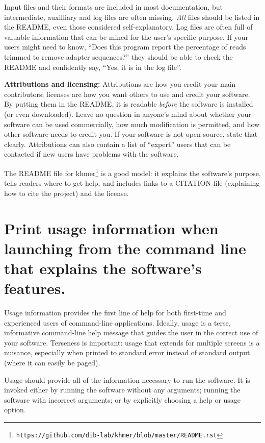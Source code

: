 \documentclass[10pt]{article}
\newcommand{\withurl}[2]{{#1}\footnote{\texttt{#2}}}
\begin{document}
Input files and their formats are included in most documentation, but
intermediate, auxilliary and log files are often missing. 
\emph{All} files should be listed in the README, even those considered self-explanatory. Log
files are often full of valuable information that can be
mined for the user's specific purpose. If your users might need to know,
``Does this program report the percentage of reads trimmed to remove
adapter sequences?'' they should be able to check the README and confidently
say, ``Yes, it is in the log file''.

\textbf{Attributions and licensing:} Attributions are how you credit
your main contributors; licenses are how you want others to use and
credit your software. By putting them in the README, it is readable \emph{before}
the software is installed (or even downloaded).
Leave no
question in anyone's mind about whether your software can be used
commercially, how much modification is permitted, and how other software
needs to credit you. If your software is not open source, state that clearly.
Attributions can also contain a list of ``expert'' users
that can be contacted if new users have problems with the software.

The README file for \withurl{khmer}{https://github.com/dib-lab/khmer/blob/master/README.rst}
is a good model:
it explains the software's purpose,
tells readers where to get help,
and includes links to a CITATION file (explaining how to cite the project)
and the license.

\section{Print usage information when launching from the command line that explains the software's features.}

Usage information provides the first line of help for both first-time and
experienced users of command-line applications.
Ideally, usage is a terse, informative command-line help message that
guides the user in the correct use of your software. Terseness is
important: usage that extends for multiple screens is a nuisance, especially when
printed to standard error instead of standard output (where it can
easily be paged).

Usage should provide all of the information necessary to run the
software. It is invoked either by running the software without
any arguments; running the software with incorrect arguments; or by
explicitly choosing a help or usage option.
\end{document}
